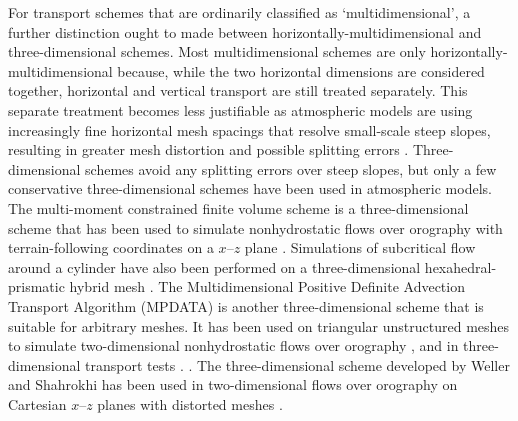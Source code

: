 For transport schemes that are ordinarily classified as `multidimensional', a further distinction ought to made between horizontally-multidimensional and three-dimensional schemes.
Most multidimensional schemes are only horizontally-multidimensional because, while the two horizontal dimensions are considered together, horizontal and vertical transport are still treated separately.
This separate treatment becomes less justifiable as atmospheric models are using increasingly fine horizontal mesh spacings that resolve small-scale steep slopes, resulting in greater mesh distortion and possible splitting errors \citep{kent2014}.
Three-dimensional schemes avoid any splitting errors over steep slopes, but only a few conservative three-dimensional schemes have been used in atmospheric models.
The multi-moment constrained finite volume scheme \citep{ii-xiao2009} is a three-dimensional scheme that has been used to simulate nonhydrostatic flows over orography with terrain-following coordinates on a $x$--$z$ plane \citep{li2013}.  Simulations of subcritical flow around a cylinder have also been performed on a three-dimensional hexahedral-prismatic hybrid mesh \citep{xie-xiao2016}.
The Multidimensional Positive Definite Advection Transport Algorithm (MPDATA) is another three-dimensional scheme that is suitable for arbitrary meshes.
It has been used on triangular unstructured meshes to simulate two-dimensional nonhydrostatic flows over orography \citep{smolarkiewicz-szmelter2011}, and in three-dimensional transport tests \citep{smolarkiewicz-szmelter2005}. 
.
The three-dimensional  scheme developed by Weller and Shahrokhi \citep{weller-shahrokhi2014} has been used in two-dimensional flows over orography on Cartesian $x$--$z$ planes with distorted meshes \citep{shaw-weller2016,weller2017}.

